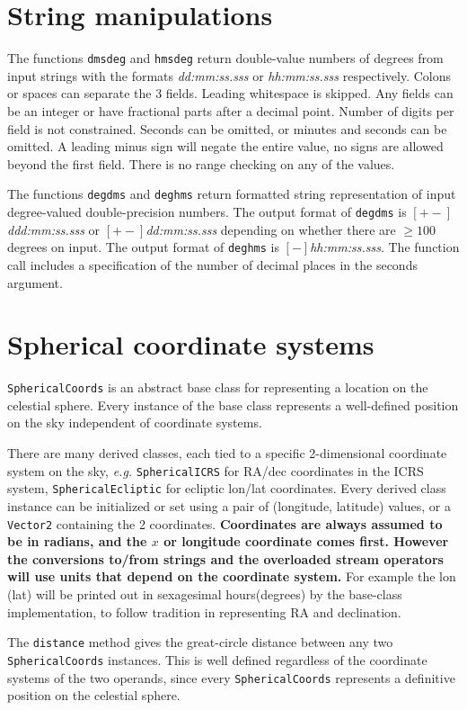 \documentclass[11pt,preprint,flushrt]{aastex}
\begin{document}
\section{String manipulations}
The functions {\tt dmsdeg} and {\tt hmsdeg} return double-value numbers of degrees from input strings with the formats {\it dd:mm:ss.sss} or {\it hh:mm:ss.sss} respectively.  
Colons or spaces can separate the 3 fields.  Leading whitespace is skipped.  Any fields can be an integer or have fractional parts after a decimal point.  Number of digits per field is not constrained.  Seconds can be omitted, or minutes and seconds can be omitted.  A leading minus sign will negate the entire value, no signs are allowed beyond the first field.  There is no range checking on any of the values.

The functions {\tt degdms} and {\tt deghms} return formatted string representation of input degree-valued double-precision numbers.  The output format of {\tt degdms}  is {\it $[+-]$ddd:mm:ss.sss} or {\it $[+-]$dd:mm:ss.sss} depending on whether there are $\ge100$ degrees on input. The output format of {\tt deghms}  is {\it $[-]$hh:mm:ss.sss}.  The function call includes a specification of the number of decimal places in the seconds argument.

\section{Spherical coordinate systems}
{\tt SphericalCoords} is an abstract base class for representing a location on the celestial sphere.  Every instance of the base class represents a well-defined position on the sky independent of coordinate systems.

There are many derived classes, each tied to a specific 2-dimensional coordinate system on the sky, {\it e.g.} {\tt SphericalICRS} for RA/dec coordinates in the ICRS system, {\tt SphericalEcliptic} for ecliptic lon/lat coordinates.  Every derived class instance can be initialized or set using a pair of (longitude, latitude) values, or a {\tt Vector2} containing the 2 coordinates.  {\bf Coordinates are always assumed to be in radians, and the $x$ or longitude coordinate comes first.  However the conversions to/from strings and the overloaded stream operators will use units that depend on the coordinate system.}  For example the lon (lat) will be printed out in sexagesimal hours(degrees) by the base-class implementation, to follow tradition in representing RA and declination.

The {\tt distance} method gives the great-circle distance between any two {\tt SphericalCoords} instances.  This is well defined regardless of the coordinate systems of the two operands, since every {\tt SphericalCoords} represents a definitive position on the celestial sphere.
\end{document}
